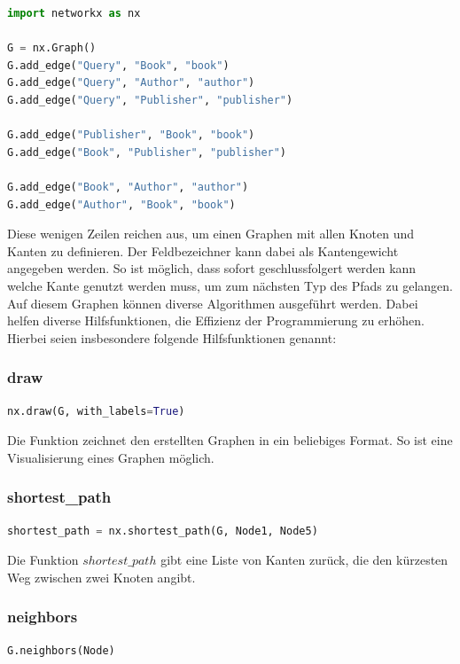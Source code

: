 \begin{lstlisting}[language=Python, caption={NetworkX-Graphen erstellen}, label={networkxgraph}]
import networkx as nx

G = nx.Graph()
G.add_edge("Query", "Book", "book")
G.add_edge("Query", "Author", "author")
G.add_edge("Query", "Publisher", "publisher")

G.add_edge("Publisher", "Book", "book")
G.add_edge("Book", "Publisher", "publisher")

G.add_edge("Book", "Author", "author")
G.add_edge("Author", "Book", "book")
\end{lstlisting}

Diese wenigen Zeilen reichen aus, um einen Graphen mit allen Knoten und Kanten zu definieren.
Der Feldbezeichner kann dabei als Kantengewicht angegeben werden.
So ist möglich, dass sofort geschlussfolgert werden kann welche Kante genutzt werden muss, um zum nächsten Typ des Pfads zu gelangen.
Auf diesem Graphen können diverse Algorithmen ausgeführt werden.
Dabei helfen diverse Hilfsfunktionen, die Effizienz der Programmierung zu erhöhen.
Hierbei seien insbesondere folgende Hilfsfunktionen genannt:

\subsubsection{draw}
    \begin{lstlisting}[language=Python, caption={Ein Graphen visualisieren}]
nx.draw(G, with_labels=True)
    \end{lstlisting}

Die Funktion zeichnet den erstellten Graphen in ein beliebiges Format.
So ist eine Visualisierung eines Graphen möglich.

\subsubsection{shortest\_path}
    \begin{lstlisting}[language=Python, caption={Der kürzeste Weg zwischen zwei Knoten}]
shortest_path = nx.shortest_path(G, Node1, Node5)
    \end{lstlisting}

Die Funktion $shortest\_path$ gibt eine Liste von Kanten zurück, die den kürzesten Weg zwischen zwei Knoten angibt.

\subsubsection{neighbors}
    \begin{lstlisting}[language=Python, caption={Alle Nachbarn eines Knoten}]
G.neighbors(Node)
    \end{lstlisting}

